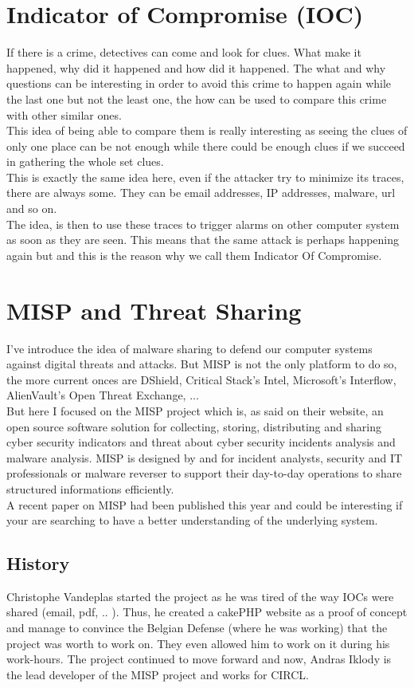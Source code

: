 \documentclass{eplmastersthesis}
\begin{document}
\section{Indicator of Compromise (IOC)}
If there is a crime, detectives can come and look for clues. What make it happened, why did it happened and how did it happened. The what and why questions can be interesting in order to avoid this crime to happen again while the last one but not the least one, the how can be used to compare this crime with other similar ones.\\
This idea of being able to compare them is really interesting as seeing the clues of only one place can be not enough while there could be enough clues if we succeed in gathering the whole set clues.\\
This is exactly the same idea here, even if the attacker try to minimize its traces, there are always some. They can be email addresses, IP addresses, malware, url and so on.\\
The idea, is then to use these traces to trigger alarms on other computer system as soon as they are seen. This means that the same attack is perhaps happening again but and this is the reason why we call them Indicator Of Compromise.


\section{MISP and Threat Sharing}
I've introduce the idea of malware sharing to defend our computer systems against digital threats and attacks. But MISP is not the only platform to do so, the more current onces are DShield, Critical Stack’s Intel, Microsoft’s Interflow, AlienVault’s Open Threat Exchange, ...\\
But here I focused on the MISP project which is, as said on their website, an open source software solution for collecting, storing, distributing and sharing cyber security indicators and threat about cyber security incidents analysis and malware analysis. MISP is designed by and for incident analysts, security and IT professionals or malware reverser to support their day-to-day operations to share structured informations efficiently.\\
A recent paper on MISP \cite{wagner2016misp} had been published this year and could be interesting if your are searching to have a better understanding of the underlying system.

\subsection{History}
Christophe Vandeplas started the project as he was tired of the way IOCs were shared (email, pdf, .. ). Thus, he created a cakePHP website as a proof of concept and manage to convince the Belgian Defense (where he was working) that the project was worth to work on. They even allowed him to work on it during his work-hours. The project continued to move forward and now, Andras Iklody is the lead developer of the MISP project and works for CIRCL.\\
\end{document}
